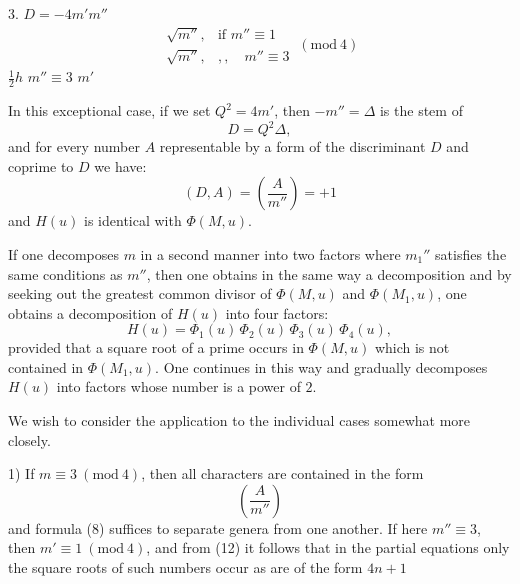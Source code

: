 3.  $D=-4m'm''$ 
\[
\begin{array}{ll}
\sqrt{m''}, & \text{if } m''\equiv 1 \\
\sqrt{m''}, & ,,\quad m''\equiv 3
\end{array}
\ (\mathrm{mod}\ 4)
\]
 $\tfrac12 h$  $m''\equiv 3$  $m'$ 

In this exceptional case, if we set $Q^2=4m'$, then $-m''=\varDelta$ is the stem of
\[
D = Q^2\varDelta,
\]
and for every number $A$ representable by a form of the discriminant $D$ and coprime to $D$ we have:
\[
(D,A) = \left(\frac{A}{m''}\right) = +1
\]
and $H(u)$ is identical with $\Phi(M,u)$.

If one decomposes $m$ in a second manner into two factors
where $m_1''$ satisfies the same conditions as $m''$, then one obtains in the same way a decomposition
and by seeking out the greatest common divisor of $\Phi(M,u)$ and $\Phi(M_1,u)$, one obtains a decomposition of $H(u)$ into four factors:
\[
H(u) = \Phi_1(u)\,\Phi_2(u)\,\Phi_3(u)\,\Phi_4(u),
\]
provided that a square root of a prime occurs in $\Phi(M,u)$ which is not contained in $\Phi(M_1,u)$. One continues in this way and gradually decomposes $H(u)$ into factors whose number is a power of $2$.

We wish to consider the application to the individual cases somewhat more closely.

1) If $m\equiv 3 \ (\mathrm{mod}\ 4)$, then all characters are contained in the form
\[
\left(\frac{A}{m''}\right)
\]
and formula (8) suffices to separate  genera from one another. If here $m''\equiv 3$, then $m'\equiv 1 \ (\mathrm{mod}\ 4)$, and from (12) it follows that in the partial equations only the square roots of such numbers occur as are of the form $4n+1$
